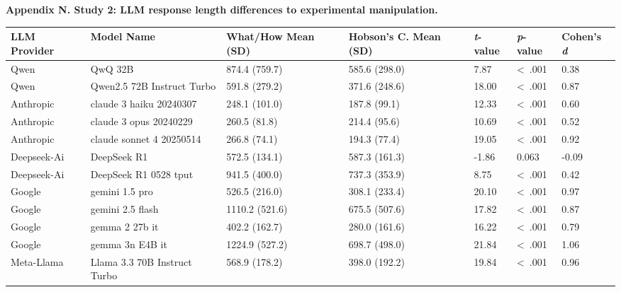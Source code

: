 \documentclass[11pt]{article}
\begin{document}
\noindent\hspace*{1cm}\textbf{\large Appendix N. Study 2: LLM response length differences to experimental manipulation.}

\vspace{1em}

{\small
\renewcommand{\arraystretch}{1.2}
\begin{tabular}{p{2.3cm} p{4cm} p{2.5cm} p{2.5cm} p{1.3cm} p{1.3cm} p{1.3cm}}
\toprule
\textbf{LLM Provider} & \textbf{Model Name} & \textbf{What/How Mean (SD)} & \textbf{Hobson's C. Mean (SD)} & \textbf{\textit{t}-value} & \textbf{\textit{p}-value} & \textbf{Cohen's \textit{d}} \\
\midrule
Qwen & QwQ 32B & 874.4 (759.7) & 585.6 (298.0) & 7.87 & \textless\ .001 & 0.38 \\
\addlinespace[0.7em]
Qwen & Qwen2.5 72B Instruct Turbo & 591.8 (279.2) & 371.6 (248.6) & 18.00 & \textless\ .001 & 0.87 \\
\addlinespace[0.7em]
\addlinespace[1.0em]
Anthropic & claude 3 haiku 20240307 & 248.1 (101.0) & 187.8 (99.1) & 12.33 & \textless\ .001 & 0.60 \\
\addlinespace[0.7em]
Anthropic & claude 3 opus 20240229 & 260.5 (81.8) & 214.4 (95.6) & 10.69 & \textless\ .001 & 0.52 \\
\addlinespace[0.7em]
Anthropic & claude sonnet 4 20250514 & 266.8 (74.1) & 194.3 (77.4) & 19.05 & \textless\ .001 & 0.92 \\
\addlinespace[0.7em]
\addlinespace[1.0em]
Deepseek-Ai & DeepSeek R1 & 572.5 (134.1) & 587.3 (161.3) & -1.86 & 0.063 & -0.09 \\
\addlinespace[0.7em]
Deepseek-Ai & DeepSeek R1 0528 tput & 941.5 (400.0) & 737.3 (353.9) & 8.75 & \textless\ .001 & 0.42 \\
\addlinespace[0.7em]
\addlinespace[1.0em]
Google & gemini 1.5 pro & 526.5 (216.0) & 308.1 (233.4) & 20.10 & \textless\ .001 & 0.97 \\
\addlinespace[0.7em]
Google & gemini 2.5 flash & 1110.2 (521.6) & 675.5 (507.6) & 17.82 & \textless\ .001 & 0.87 \\
\addlinespace[0.7em]
Google & gemma 2 27b it & 402.2 (162.7) & 280.0 (161.6) & 16.22 & \textless\ .001 & 0.79 \\
\addlinespace[0.7em]
Google & gemma 3n E4B it & 1224.9 (527.2) & 698.7 (498.0) & 21.84 & \textless\ .001 & 1.06 \\
\addlinespace[0.7em]
\addlinespace[1.0em]
Meta-Llama & Llama 3.3 70B Instruct Turbo & 568.9 (178.2) & 398.0 (192.2) & 19.84 & \textless\ .001 & 0.96 \\

\end{tabular}}
\end{document}
